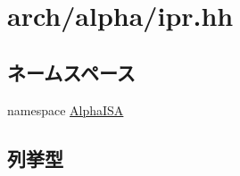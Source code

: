 \hypertarget{ipr_8hh}{
\section{arch/alpha/ipr.hh}
\label{ipr_8hh}
}
\subsection*{ネームスペース}
\begin{DoxyCompactItemize}
\item 
namespace \hyperlink{namespaceAlphaISA}{AlphaISA}
\end{DoxyCompactItemize}
\subsection*{列挙型}
